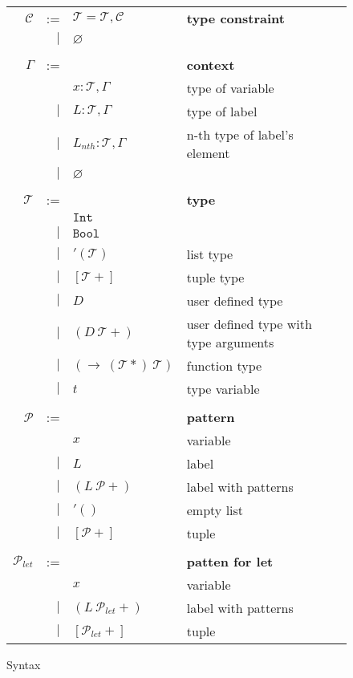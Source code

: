 \documentclass{article}
\begin{document}
\begin{figure}[tb]
    \centering
    \begin{tabular}{rrll}
    $\mathcal{C}$ & := & $\mathcal{T} = \mathcal{T}, \mathcal{C}$ & \bf{type constraint} \\
        & $|$ & $\varnothing$ \\ \\

    $\Gamma$ & := & & \bf{context} \\
        &     & $x: \mathcal{T}, \Gamma$ & type of variable \\
        & $|$ & $L: \mathcal{T}, \Gamma$ & type of label \\
        & $|$ & $L_{nth}: \mathcal{T}, \Gamma$ & n-th type of label's element \\
        & $|$ & $\varnothing$ \\ \\

    $\mathcal{T}$ & := & & \bf{type} \\
        &     & $\mathtt{Int}$ \\
        & $|$ & $\mathtt{Bool}$ \\
        & $|$ & $'(\mathcal{T})$ & list type \\
        & $|$ & $[\mathcal{T}+]$ & tuple type \\
        & $|$ & $D$    & user defined type \\
        & $|$ & $(D\ \mathcal{T}+)$ & user defined type with type arguments \\
        & $|$ & $(\rightarrow\ (\mathcal{T}*)\ \mathcal{T})$ & function type \\
        & $|$ & $t$ & type variable \\ \\

    $\mathcal{P}$ & := & & \bf{pattern} \\
        &     & $x$ & variable \\
        & $|$ & $L$ & label \\
        & $|$ & $(L\ \mathcal{P}+)$ & label with patterns \\
        & $|$ & $'()$ & empty list \\
        & $|$ & $[\mathcal{P}+]$ & tuple \\ \\

    $\mathcal{P}_{let}$ & := & & \bf{patten for let} \\
        &     & $x$ & variable \\
        & $|$ & $(L\ \mathcal{P}_{let}+)$ & label with patterns \\
        & $|$ & $[\mathcal{P}_{let}+]$ & tuple \\
    \end{tabular}
    \caption{Syntax}
    \label{fig:syntax}
\end{figure}
\end{document}
